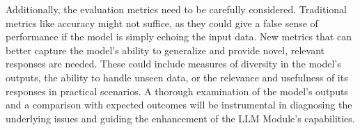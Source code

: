 \begin{spacing}{1.5}
\begin{sloppypar}
Additionally, the evaluation metrics need to be carefully considered. Traditional metrics like accuracy might not suffice, as they could give a false sense of performance if the model is simply echoing the input data. New metrics that can better capture the model's ability to generalize and provide novel, relevant responses are needed. These could include measures of diversity in the model's outputs, the ability to handle unseen data, or the relevance and usefulness of its responses in practical scenarios. A thorough examination of the model's outputs and a comparison with expected outcomes will be instrumental in diagnosing the underlying issues and guiding the enhancement of the LLM Module's capabilities.

\end{sloppypar}
 \end{spacing}